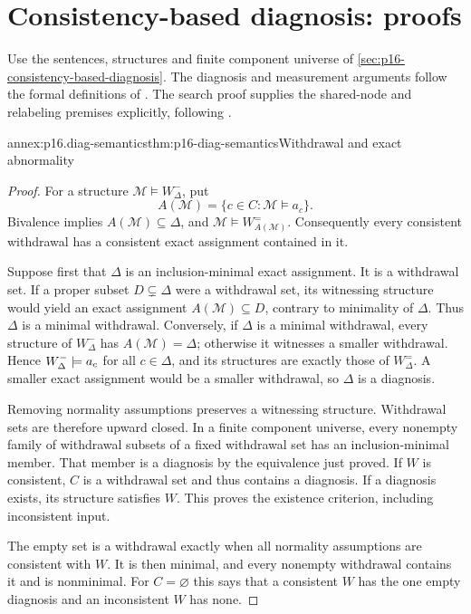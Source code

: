 \section{Consistency-based diagnosis: proofs}
\label{sec:annex-p16-consistency-based-diagnosis}

Use the sentences, structures and finite component universe of
\cref{sec:p16-consistency-based-diagnosis}. The diagnosis and
measurement arguments follow the formal definitions of
\cite{Reiter1987Diagnosis}. The search proof supplies the
shared-node and relabeling premises explicitly, following
\cite[sec.~4, author version]{GreinerSmithWilkerson1989Correction}.

\begin{annexitem}{annex:p16.diag-semantics}{thm:p16-diag-semantics}{Withdrawal and exact abnormality}
\begin{proof}
For a structure \(\mathcal M\models W^-_\Delta\), put
\[
             A(\mathcal M)=\{c\in C:\mathcal M\models a_c\}.
\]
Bivalence implies \(A(\mathcal M)\subseteq\Delta\), and
\(\mathcal M\models W^=_{A(\mathcal M)}\).
Consequently every consistent withdrawal has a consistent exact
assignment contained in it.

Suppose first that \(\Delta\) is an inclusion-minimal exact
assignment. It is a withdrawal set. If a proper subset
\(D\subsetneq\Delta\) were a withdrawal set, its witnessing
structure would yield an exact assignment
\(A(\mathcal M)\subseteq D\), contrary to minimality of
\(\Delta\). Thus \(\Delta\) is a minimal withdrawal.
Conversely, if \(\Delta\) is a minimal withdrawal, every
structure of \(W^-_\Delta\) has \(A(\mathcal M)=\Delta\);
otherwise it witnesses a smaller withdrawal. Hence
\(W^-_\Delta\models a_c\) for all \(c\in\Delta\),
and its structures are exactly those of \(W^=_\Delta\).
A smaller exact assignment would be a smaller withdrawal,
so \(\Delta\) is a diagnosis.

Removing normality assumptions preserves a witnessing structure.
Withdrawal sets are therefore upward closed. In a finite
component universe, every nonempty family of withdrawal subsets
of a fixed withdrawal set has an inclusion-minimal member.
That member is a diagnosis by the equivalence just proved.
If \(W\) is consistent, \(C\) is a withdrawal set and thus
contains a diagnosis. If a diagnosis exists, its structure
satisfies \(W\). This proves the existence criterion, including
inconsistent input.

The empty set is a withdrawal exactly when all normality
assumptions are consistent with \(W\). It is then minimal,
and every nonempty withdrawal contains it and is nonminimal.
For \(C=\varnothing\) this says that a consistent \(W\)
has the one empty diagnosis and an inconsistent \(W\)
has none.


\end{proof}
\end{annexitem}

